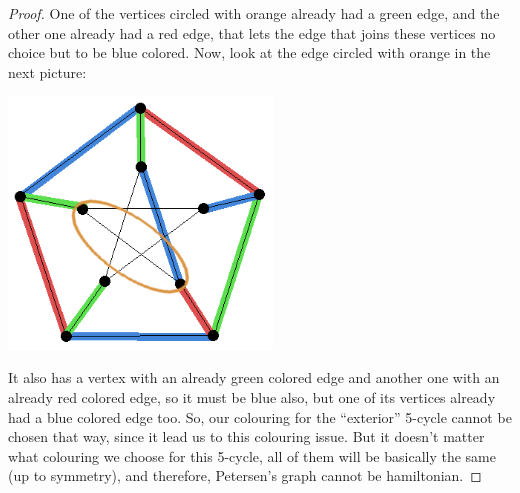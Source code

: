 \begin{proof}
        One of the vertices circled with orange already had a green edge, and the other one already had a red edge, that lets the edge that joins these
        vertices no choice but to be blue colored. Now, look at the edge circled with orange in the next picture:
        \begin{center}
            \includegraphics[width=7cm]{PetersenIsNotHamiltonian/Petersen5.png}    
        \end{center}\pn
        
        It also has a vertex with an already green colored edge and another one with an already red colored edge, so it must be blue also,
        but one of its vertices already had a blue colored edge too. So, our colouring for the ``exterior'' 5-cycle cannot be chosen
        that way, since it lead us to this colouring issue. But it doesn't matter what colouring we choose for this 5-cycle, all of them
        will be basically the same (up to symmetry), and therefore, Petersen's graph cannot be hamiltonian.    
    \end{proof}